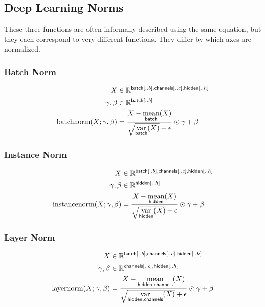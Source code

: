 \documentclass{article}
\newcommand{\reals}{\mathbb{R}}
\begin{document}
\subsection{Deep Learning Norms}

These three functions are often informally described using the same
equation, but they each correspond to very different functions. They differ
by which axes are normalized.

\subsubsection*{Batch Norm}

\begin{align*} 
X &\in \reals^{{\nset{batch}{..b}, \nset{channels}{..c}, \nset{hidden}{..h}}}\\
\gamma, \beta &\in \reals^{{\nset{batch}{..b}}} \\
\text{batchnorm}(X; \gamma, \beta) &= \frac{X - \nfun{batch}{mean}(X)}{\sqrt{\nfun{batch}{var}(X)} + \epsilon} \odot \gamma + \beta
\end{align*}


\subsubsection*{Instance Norm}

\begin{align*} 
X &\in \reals^{{\nset{batch}{..b}, \nset{channels}{..c}, \nset{hidden}{..h}}}\\
\gamma, \beta &\in \reals^{{\nset{hidden}{..h}}} \\
\text{instancenorm}(X; \gamma, \beta) &= \frac{X - \nfun{hidden}{\text{mean}}(X)}{\sqrt{\nfun{hidden}{\text{var}}(X)} + \epsilon} \odot \gamma + \beta
\end{align*}

\subsubsection*{Layer Norm}

\begin{align*} 
X &\in \reals^{{\nset{batch}{..b}, \nset{channels}{..c}, \nset{hidden}{..h}}} \\
\gamma, \beta &\in \reals^{{\nset{channels}{..c}, \nset{hidden}{..h}}} \\
\text{layernorm}(X; \gamma, \beta) &= \frac{X - \nfun{hidden,channels}{\text{mean}}(X)}{\sqrt{\nfun{hidden, channels}{\text{var}}(X)} + \epsilon} \odot \gamma + \beta 
\end{align*}
\end{document}
